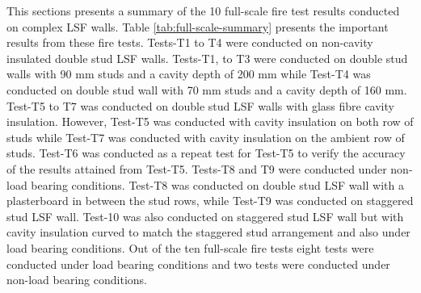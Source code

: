 This sections presents a summary of the 10 full-scale fire test results conducted on complex LSF walls. Table \ref{tab:full-scale-summary} presents the important results from these fire tests. Tests-T1 to T4 were conducted on non-cavity insulated double stud LSF walls. Tests-T1, to T3 were conducted on double stud walls with 90 mm studs and a cavity depth of 200 mm while Test-T4 was conducted on double stud wall with 70 mm studs and a cavity depth of 160 mm. Test-T5 to T7 was conducted on double stud LSF walls with glass fibre cavity insulation. However, Test-T5 was conducted with cavity insulation on both row of studs while Test-T7 was conducted with cavity insulation on the ambient row of studs. Test-T6 was conducted as a repeat test for Test-T5 to verify the accuracy of the results attained from Test-T5. Tests-T8 and T9 were conducted under non-load bearing conditions. Test-T8 was conducted on double stud LSF wall with a plasterboard in between the stud rows, while Test-T9 was conducted on staggered stud LSF wall. Test-10 was also conducted on staggered stud LSF wall but with cavity insulation curved to match the staggered stud arrangement and also under load bearing conditions. Out of the ten full-scale fire tests eight tests were conducted under load bearing conditions and two tests were conducted under non-load bearing conditions.
